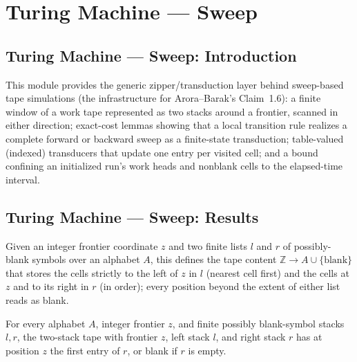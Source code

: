 \section{Turing Machine --- Sweep}
\subsection*{Turing Machine --- Sweep: Introduction}

This module provides the generic zipper/transduction layer behind sweep-based
tape simulations (the infrastructure for Arora--Barak's Claim~1.6): a finite
window of a work tape represented as two stacks around a frontier, scanned in
either direction; exact-cost lemmas showing that a local transition rule
realizes a complete forward or backward sweep as a finite-state transduction;
table-valued (indexed) transducers that update one entry per visited cell; and
a bound confining an initialized run's work heads and nonblank cells to the
elapsed-time interval.

\subsection*{Turing Machine --- Sweep: Results}

\begin{definition}
\label{Turing.FinTM.sweepTape}
\leanok
Given an integer frontier coordinate $z$ and two finite lists $l$ and $r$ of
possibly-blank symbols over an alphabet $A$, this defines the tape content
$\mathbb{Z} \to A \cup \{\text{blank}\}$ that stores the cells strictly to the
left of $z$ in $l$ (nearest cell first) and the cells at $z$ and to its right
in $r$ (in order); every position beyond the extent of either list reads as
blank.
\end{definition}

\begin{lemma}
\label{Turing.FinTM.sweepTape_read}
\leanok
{}
For every alphabet $A$, integer frontier $z$, and finite possibly blank-symbol stacks
$l,r$, the two-stack tape with frontier $z$, left stack $l$, and right stack $r$ has at
position $z$ the first entry of $r$, or blank if $r$ is empty.
\end{lemma}

